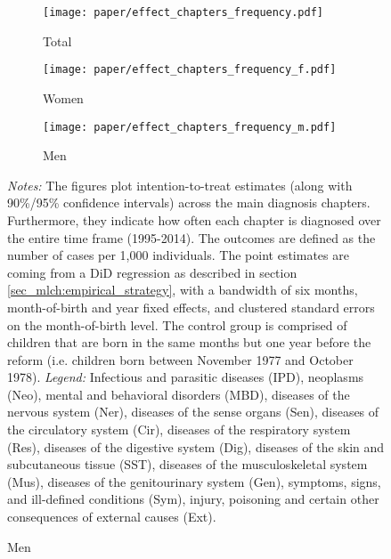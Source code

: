 \begin{landscape}
	\vspace*{\fill}
	\begin{figure}[H]\centering
		\caption{Intention-to-treat effects across \textbf{main diagnosis chapters}}\label{fig_mlch: DD_across_main chapters}
		\begin{subfigure}[h]{0.31\linewidth}\centering\caption{Total}
			\texttt{[image: paper/effect\_chapters\_frequency.pdf]}
		\end{subfigure}
		\begin{subfigure}[h]{0.31\linewidth}\centering\caption{Women}
			\texttt{[image: paper/effect\_chapters\_frequency\_f.pdf]}
		\end{subfigure}
		\begin{subfigure}[h]{0.31\linewidth}\centering\caption{Men}
			\texttt{[image: paper/effect\_chapters\_frequency\_m.pdf]}
		\end{subfigure}
		\scriptsize
		\begin{minipage}{\linewidth}
			\emph{Notes:} The figures plot intention-to-treat estimates (along with 90\%/95\% confidence intervals) across the main diagnosis chapters. Furthermore, they indicate how often each chapter is diagnosed over the entire time frame (1995-2014). The outcomes are defined as the number of cases per 1,000 individuals. The point estimates are coming from a DiD regression as described in section \ref{sec_mlch:empirical_strategy}, with a bandwidth of six months, month-of-birth and year fixed effects, and clustered standard errors on the month-of-birth level. The control group is comprised of children that are born in the same months but one year before the reform (i.e. children born between November 1977 and October 1978). \newline
			\emph{Legend:} Infectious and parasitic diseases (IPD), neoplasms (Neo), mental and behavioral disorders (MBD), diseases of the nervous system (Ner), diseases of the sense organs (Sen), diseases of the circulatory system (Cir), diseases of the respiratory system (Res), diseases of the digestive system (Dig), diseases of the skin and subcutaneous tissue (SST), diseases of the musculoskeletal system (Mus), diseases of the genitourinary system (Gen), symptoms, signs, and ill-defined conditions (Sym), injury, poisoning and certain other consequences of external causes (Ext).
			
		\end{minipage}
	\end{figure}
	\vspace*{\fill}\clearpage
\end{landscape}

